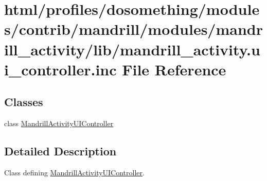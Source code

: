 \hypertarget{mandrill__activity_8ui__controller_8inc}{
\section{html/profiles/dosomething/modules/contrib/mandrill/modules/mandrill\_\-activity/lib/mandrill\_\-activity.ui\_\-controller.inc File Reference}
\label{mandrill__activity_8ui__controller_8inc}
}
\subsection*{Classes}
\begin{DoxyCompactItemize}
\item 
class \hyperlink{classMandrillActivityUIController}{MandrillActivityUIController}
\end{DoxyCompactItemize}


\subsection{Detailed Description}
Class defining \hyperlink{classMandrillActivityUIController}{MandrillActivityUIController}. 